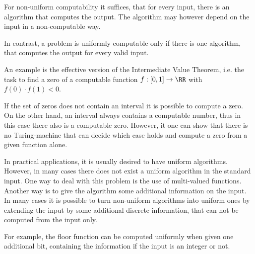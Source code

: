 For non-uniform computability it suffices, that for every input, there is an algorithm that computes the output. 
The algorithm may however depend on the input in a non-computable way.

In contrast, a problem is uniformly computable only if there is one algorithm, that computes the output for every valid input. 

An example is the effective version of the Intermediate Value Theorem, i.e. the
task to find a zero of a computable function $f : [0,1] \to \RR$ with
$f(0)\cdot f(1) < 0$.

If the set of zeros does not contain an interval it is possible to
compute a zero.
On the other hand, an interval always contains a computable number, thus in
this case there also is a computable zero.
However, it one can show that there is no Turing-machine that can decide which
case holds and compute a zero from a given function alone.

In practical applications, it is usually desired to have uniform algorithms.
However, in many cases there does not exist a uniform algorithm in the standard
input.
One way to deal with this problem is the use of multi-valued functions.
Another way is to give the algorithm some additional information on the input.
In many cases it is possible to turn non-uniform algorithms into uniform ones
by extending the input by some additional discrete information, that can not be
computed from the input only.

For example, the floor function can be computed uniformly when given one
additional bit, containing the information if the input is an integer or
not.  
